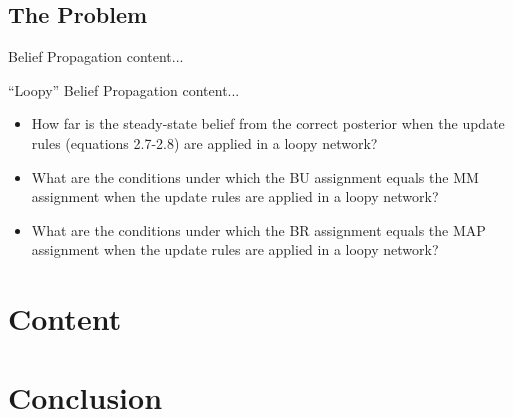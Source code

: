 \documentclass[handout]{beamer}
\begin{document}
\subsection{The Problem}
\begin{frame}{Belief Propagation}
    content...
\end{frame}
\begin{frame}{``Loopy'' Belief Propagation}
    content...
\end{frame}
\begin{frame}
    \begin{itemize}
        \item How far is the steady-state belief from the correct posterior when the update rules (equations 2.7-2.8) are applied in a loopy network?
        \item What are the conditions under which the BU assignment equals the MM assignment when the update rules are applied in a loopy network?
        \item What are the conditions under which the BR assignment equals the MAP assignment when the update rules are applied in a loopy network?
    \end{itemize}
\end{frame}
\section{Content}
\begin{frame}
\end{frame}
\section{Conclusion}
\begin{frame}
\end{frame}
\end{document}
